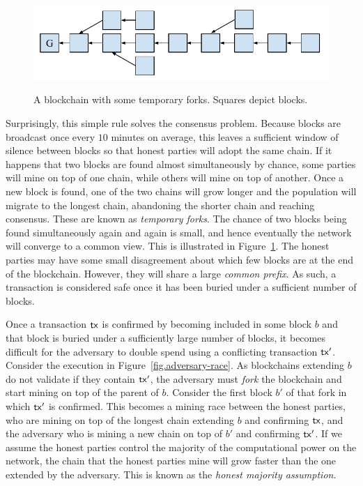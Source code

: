 \begin{figure}[h]
    \caption{
    A blockchain with some temporary forks. Squares depict blocks.
    }
    \centering
    \includegraphics[width=0.7\columnwidth,keepaspectratio]{chapters/introduction/figures/blockchain.pdf}
    \label{fig.blockchain}
\end{figure}

Surprisingly, this simple rule solves the consensus problem. Because blocks are
broadcast once every $10$ minutes on average, this leaves a sufficient window of
silence between blocks so that honest parties will adopt the same chain. If it
happens that two blocks are found almost simultaneously by chance, some parties
will mine on top of one chain, while others will mine on top of another. Once a
new block is found, one of the two chains will grow longer and the population
will migrate to the longest chain, abandoning the shorter chain and reaching
consensus. These are known as \emph{temporary forks}. The
chance of two blocks being found simultaneously again and again is small, and
hence eventually the network will converge to a common view. This is illustrated
in Figure~\ref{fig.blockchain}. The honest parties may have some small
disagreement about which few blocks are at the end of the blockchain. However,
they will share a large \emph{common prefix}. As such, a transaction is
considered safe once it has been buried under a sufficient number of blocks.

Once a transaction $\mathsf{tx}$ is confirmed by becoming included in some block $b$ and
that block is buried under a sufficiently large number of blocks, it
becomes difficult for the adversary to double spend using a conflicting
transaction $\mathsf{tx}'$. Consider the execution in Figure~\ref{fig.adversary-race}.
As blockchains extending $b$ do not validate if they
contain $\mathsf{tx}'$, the adversary must \emph{fork} the blockchain and start mining
on top of the parent of $b$. Consider the first block $b'$ of that fork in which
$\mathsf{tx}'$ is confirmed. This becomes a mining race between the honest parties, who
are mining on top of the longest chain extending $b$ and confirming $\mathsf{tx}$, and
the adversary who is mining a new chain on top of $b'$ and confirming $\mathsf{tx}'$. If
we assume the honest parties control the majority of the computational power on
the network, the chain that the honest parties mine will grow faster than the
one extended by the adversary. This is known as the \emph{honest majority
assumption}.


